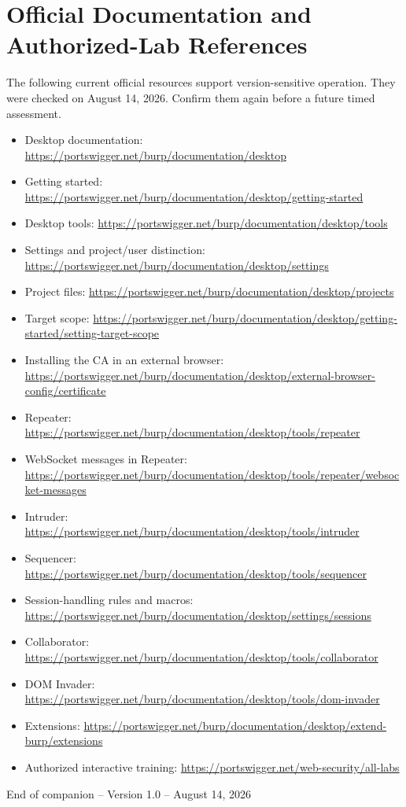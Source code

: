 \documentclass[11pt]{article}
\begin{document}
\section{Official Documentation and Authorized-Lab References}

The following current official resources support version-sensitive operation.
They were checked on August 14, 2026. Confirm them again before a future timed
assessment.

\begin{itemize}
  \item Desktop documentation: \url{https://portswigger.net/burp/documentation/desktop}
  \item Getting started: \url{https://portswigger.net/burp/documentation/desktop/getting-started}
  \item Desktop tools: \url{https://portswigger.net/burp/documentation/desktop/tools}
  \item Settings and project/user distinction: \url{https://portswigger.net/burp/documentation/desktop/settings}
  \item Project files: \url{https://portswigger.net/burp/documentation/desktop/projects}
  \item Target scope: \url{https://portswigger.net/burp/documentation/desktop/getting-started/setting-target-scope}
  \item Installing the CA in an external browser: \url{https://portswigger.net/burp/documentation/desktop/external-browser-config/certificate}
  \item Repeater: \url{https://portswigger.net/burp/documentation/desktop/tools/repeater}
  \item WebSocket messages in Repeater: \url{https://portswigger.net/burp/documentation/desktop/tools/repeater/websocket-messages}
  \item Intruder: \url{https://portswigger.net/burp/documentation/desktop/tools/intruder}
  \item Sequencer: \url{https://portswigger.net/burp/documentation/desktop/tools/sequencer}
  \item Session-handling rules and macros: \url{https://portswigger.net/burp/documentation/desktop/settings/sessions}
  \item Collaborator: \url{https://portswigger.net/burp/documentation/desktop/tools/collaborator}
  \item DOM Invader: \url{https://portswigger.net/burp/documentation/desktop/tools/dom-invader}
  \item Extensions: \url{https://portswigger.net/burp/documentation/desktop/extend-burp/extensions}
  \item Authorized interactive training: \url{https://portswigger.net/web-security/all-labs}
\end{itemize}

\vfill
\begin{center}
  \color{TextGray}\sffamily\small
  End of companion -- Version 1.0 -- August 14, 2026
\end{center}
\end{document}
